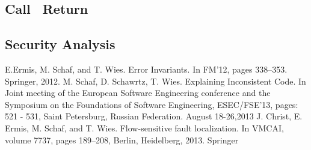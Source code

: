 \documentclass{article}
\begin{document}
\subsection{Call \ Return}
\subsection{Security Analysis}
\newpage

\begin{thebibliography}{9}
E.Ermis, M. Schaf, and T. Wies. Error Invariants. In FM’12, pages 338–353. Springer, 2012.
M. Schaf, D. Schawrtz, T. Wies. Explaining Inconsistent Code. In Joint meeting of the European Software Engineering conference and the Symposium on the Foundations of Software Engineering, ESEC/FSE’13, pages: 521 - 531, Saint Petersburg, Russian Federation. August 18-26,2013 
J. Christ, E. Ermis, M. Schaf, and T. Wies. Flow-sensitive fault localization. In VMCAI, volume 7737, pages 189–208, Berlin, Heidelberg, 2013. Springer 
\end{thebibliography}
\end{document}
